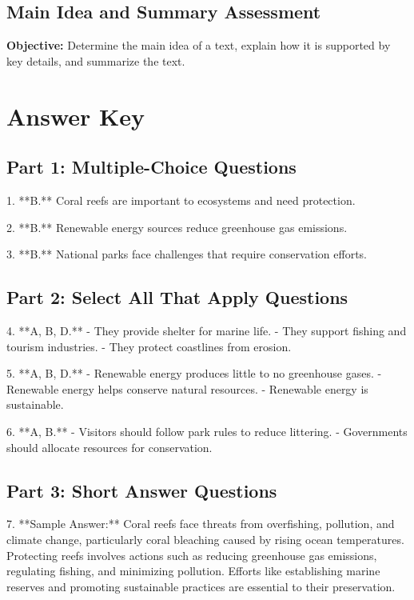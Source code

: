 \documentclass[12pt]{article}
\begin{document}
\subsection*{Main Idea and Summary Assessment}
\onehalfspacing

\begin{tcolorbox}[colframe=black!40, colback=gray!0, title=Learning Objective]
\textbf{Objective:} Determine the main idea of a text, explain how it is supported by key details, and summarize the text.
\end{tcolorbox}

\section*{Answer Key}

\subsection*{Part 1: Multiple-Choice Questions}

1. **B.** Coral reefs are important to ecosystems and need protection.

2. **B.** Renewable energy sources reduce greenhouse gas emissions.

3. **B.** National parks face challenges that require conservation efforts.

\subsection*{Part 2: Select All That Apply Questions}

4. **A, B, D.**  
   - They provide shelter for marine life.  
   - They support fishing and tourism industries.  
   - They protect coastlines from erosion.  

5. **A, B, D.**  
   - Renewable energy produces little to no greenhouse gases.  
   - Renewable energy helps conserve natural resources.  
   - Renewable energy is sustainable.  

6. **A, B.**  
   - Visitors should follow park rules to reduce littering.  
   - Governments should allocate resources for conservation.  

\subsection*{Part 3: Short Answer Questions}

7. **Sample Answer:** Coral reefs face threats from overfishing, pollution, and climate change, particularly coral bleaching caused by rising ocean temperatures. Protecting reefs involves actions such as reducing greenhouse gas emissions, regulating fishing, and minimizing pollution. Efforts like establishing marine reserves and promoting sustainable practices are essential to their preservation.
\end{document}

